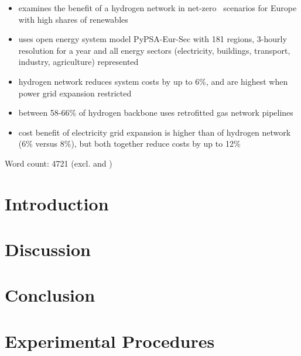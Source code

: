 \documentclass[12pt,preprint]{elsarticle}
\newcommand{\co}{\ce{CO2}~}
\begin{document}
\begin{itemize}
	\item examines the benefit of a hydrogen network in net-zero \co scenarios for Europe with high shares of renewables
	\item uses open energy system model PyPSA-Eur-Sec with 181 regions, 3-hourly resolution for a year and all energy sectors (electricity, buildings, transport, industry, agriculture) represented
	\item hydrogen network reduces system costs by up to 6\%, and are highest when power grid expansion restricted
	\item between 58-66\% of hydrogen backbone uses retrofitted gas network pipelines
	\item cost benefit of electricity grid expansion is higher than of hydrogen network (6\% versus 8\%), but both together reduce costs by up to 12\%
\end{itemize}

Word count: 4721 (excl.  and )

\newpage
\section*{Introduction}
\label{sec:intro}






\section*{Discussion}
\label{sec:discussion}



\section*{Conclusion}
\label{sec:conclusion}



\section*{Experimental Procedures}
\label{sec:methods}
\end{document}
